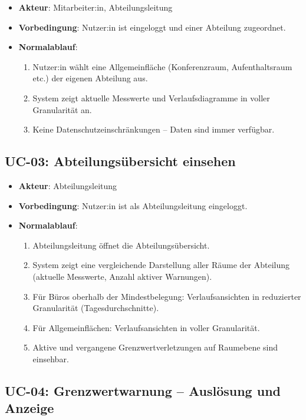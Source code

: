 \documentclass[12pt,a4paper]{article}
\begin{document}
\begin{itemize}
  \item \textbf{Akteur}: Mitarbeiter:in, Abteilungsleitung
  \item \textbf{Vorbedingung}: Nutzer:in ist eingeloggt und einer Abteilung zugeordnet.
  \item \textbf{Normalablauf}:
    \begin{enumerate}
      \item Nutzer:in wählt eine Allgemeinfläche (Konferenzraum, Aufenthaltsraum etc.) der eigenen Abteilung aus.
      \item System zeigt aktuelle Messwerte und Verlaufsdiagramme in voller Granularität an.
      \item Keine Datenschutzeinschränkungen -- Daten sind immer verfügbar.
    \end{enumerate}
\end{itemize}

\subsection{UC-03: Abteilungsübersicht einsehen}

\begin{itemize}
  \item \textbf{Akteur}: Abteilungsleitung
  \item \textbf{Vorbedingung}: Nutzer:in ist als Abteilungsleitung eingeloggt.
  \item \textbf{Normalablauf}:
    \begin{enumerate}
      \item Abteilungsleitung öffnet die Abteilungsübersicht.
      \item System zeigt eine vergleichende Darstellung aller Räume der Abteilung (aktuelle Messwerte, Anzahl aktiver Warnungen).
      \item Für Büros oberhalb der Mindestbelegung: Verlaufsansichten in reduzierter Granularität (Tagesdurchschnitte).
      \item Für Allgemeinflächen: Verlaufsansichten in voller Granularität.
      \item Aktive und vergangene Grenzwertverletzungen auf Raumebene sind einsehbar.
    \end{enumerate}
\end{itemize}

\subsection{UC-04: Grenzwertwarnung -- Auslösung und Anzeige}
\end{document}

